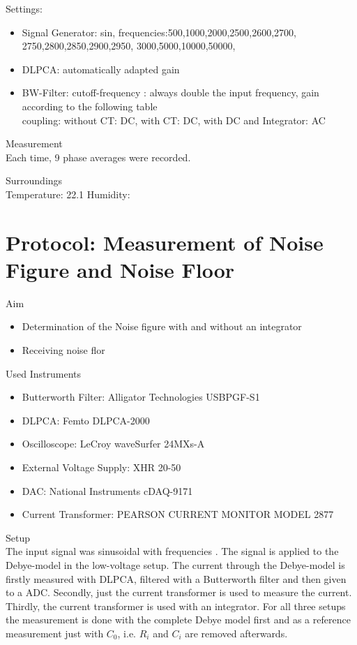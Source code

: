 {\large Settings:} \newline
\begin{itemize}
\item Signal Generator:  sin, frequencies:500,1000,2000,2500,2600,2700,
2750,2800,2850,2900,2950,
3000,5000,10000,50000,\\
\item DLPCA:  automatically adapted gain
\item BW-Filter:  cutoff-frequency : always double the input frequency, gain according to the following table\\ coupling: without CT: DC, with CT: DC, with DC and Integrator: AC
\end{itemize}
\large{Measurement} \\
Each time, 9 phase averages were recorded. 

\large{Surroundings} \\
Temperature: 22.1
Humidity: 


\section{Protocol: Measurement of Noise Figure and Noise Floor}
\large{Aim} \\
\begin{itemize}
\item Determination of the Noise figure with and without an integrator 
\item Receiving noise flor 
\end{itemize}
\large{Used Instruments} 
\begin{itemize}
 \item Butterworth Filter: Alligator Technologies USBPGF-S1
 \item DLPCA: Femto DLPCA-2000
 \item Oscilloscope: LeCroy waveSurfer 24MXs-A
 \item External Voltage Supply:  XHR 20-50
 \item DAC: National Instruments cDAQ-9171
 \item Current Transformer: PEARSON CURRENT
MONITOR MODEL 2877

\end{itemize}


\large{Setup} \\
The input signal was  sinusoidal with frequencies . The signal is applied to the Debye-model in the low-voltage setup. The current through the Debye-model is firstly measured with DLPCA, filtered with a Butterworth filter and then given to a ADC. Secondly, just the current transformer is used to measure the current. Thirdly, the current transformer is used with an integrator. 
For all three setups the measurement is done with the complete Debye model first and as a reference measurement just with $C_0$, i.e. $R_i$ and $C_i$ are removed afterwards.\\ 

